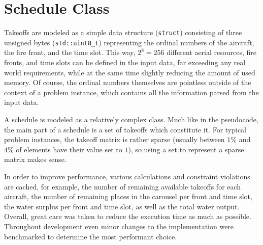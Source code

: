 \section{Schedule Class}

Takeoffs are modeled as a simple data structure (\texttt{struct}) consisting of three unsigned bytes (\texttt{std::uint8\_t}) representing the ordinal numbers of the aircraft, the fire front, and the time slot.
This way, $2^8 = 256$ different aerial resources, fire fronts, and time slots can be defined in the input data, far exceeding any real world requirements, while at the same time slightly reducing the amount of used memory.
Of course, the ordinal numbers themselves are pointless outside of the context of a problem instance, which contains all the information parsed from the input data.

A schedule is modeled as a relatively complex class.
Much like in the pseudocode, the main part of a schedule is a set of takeoffs which constitute it.
For typical problem instances, the takeoff matrix is rather sparse (usually between $1\%$ and $4\%$ of elements have their value set to $1$), so using a set to represent a sparse matrix makes sense.

In order to improve performance, various calculations and constraint violations are cached, for example, the number of remaining available takeoffs for each aircraft, the number of remaining places in the carousel per front and time slot, the water surplus per front and time slot, as well as the total water output.
Overall, great care was taken to reduce the execution time as much as possible.
Throughout development even minor changes to the implementation were benchmarked to determine the most performant choice.

